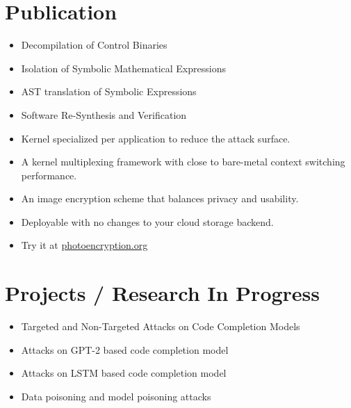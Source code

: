 \documentclass[11pt,a4paper,sans]{moderncv}
\begin{document}
\makecvtitle

\section{Publication}
{
    \begin{itemize}
        \item Decompilation of Control Binaries
        \item Isolation of Symbolic Mathematical Expressions
        \item AST translation of Symbolic Expressions
        \item Software Re-Synthesis and Verification
    \end{itemize}
}

{
    \begin{itemize}
        \item Kernel specialized per application to reduce the attack surface.
        \item A kernel multiplexing framework with close to bare-metal context
        switching performance.
    \end{itemize}
}

{
    \begin{itemize}
    \item An image encryption scheme that balances privacy and usability.
    \item Deployable with no changes to your cloud storage backend.
    \item Try it at \href{https://photoencryption.org}{photoencryption.org}
    \end{itemize}
}
\section{Projects / Research In Progress}

{
    \begin{itemize}
        \item Targeted and Non-Targeted Attacks on Code Completion Models
        \item Attacks on GPT-2 based code completion model
        \item Attacks on LSTM based code completion model
        \item Data poisoning and model poisoning attacks
    \end{itemize}
}
\end{document}
